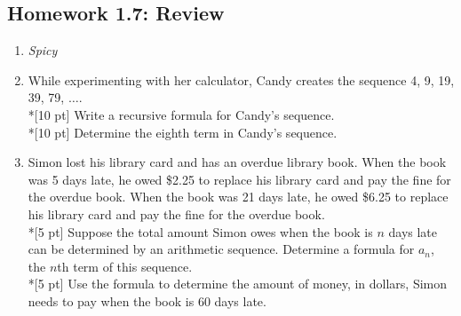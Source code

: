 \documentclass[12pt, oneside]{article}
\begin{document}
\subsection*{Homework 1.7: Review}
\begin{enumerate}
  \item
  \emph{Spicy}
  \item %
  While experimenting with her calculator, Candy creates the sequence 4, 9, 19, 39, 79, $\ldots$.\\*[10 pt]
  Write a recursive formula for Candy's sequence.\\*[10 pt]
  Determine the eighth term in Candy's sequence.

  \item %
  Simon lost his library card and has an overdue library book. When the book was 5 days late, he owed \$2.25 to replace his library card and pay the fine for the overdue book. When the book was 21 days late, he owed \$6.25 to replace his library card and pay the fine for the overdue book.\\*[5 pt]
  Suppose the total amount Simon owes when the book is $n$ days late can be determined by an arithmetic sequence. Determine a formula for $a_n$, the $n$th term of this sequence.\\*[5 pt]
  Use the formula to determine the amount of money, in dollars, Simon needs to pay when the book is 60 days late.


\end{enumerate}


\newpage
\end{document}
